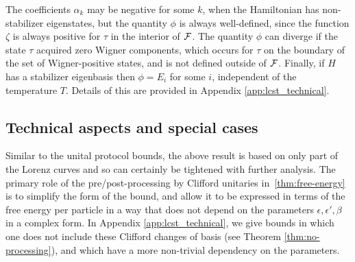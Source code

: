 \documentclass[pra,
aps,
twocolumn,
superscriptaddress,
groupedaddress,
nofootinbib,
reprint
]{revtex4-1}
\begin{document}
The coefficients $\alpha_k$ may be negative for some $k$, when the Hamiltonian has non-stabilizer eigenstates, but the quantity $\phi$ is always well-defined, since the function $\zeta$ is always positive for $\tau$ in the interior of ${\mathcal F}$. The quantity $\phi$ can diverge if the state $\tau$ acquired zero Wigner components, which occurs for $\tau$ on the boundary of the set of Wigner-positive states, and is not defined outside of ${\mathcal F}$. Finally, if $H$ has a stabilizer eigenbasis then $\phi = E_i$ for some $i$, independent of the temperature $T$. Details of this are provided in Appendix \ref{app:lcst_technical}.

\subsection{Technical aspects and special cases}
Similar to the unital protocol bounds, the above result is based on only part of the Lorenz curves and so can certainly be tightened with further analysis. The primary role of the pre/post-processing by Clifford unitaries in~\cref{thm:free-energy} is to simplify the form of the bound, and allow it to be expressed in terms of the free energy per particle in a way that does not depend on the parameters $\epsilon, \epsilon', \beta$ in a complex form. In Appendix \ref{app:lcst_technical}, we give bounds in which one does not include these Clifford changes of basis (see Theorem \ref{thm:no-processing}), and which have a more non-trivial dependency on the parameters.
\end{document}
